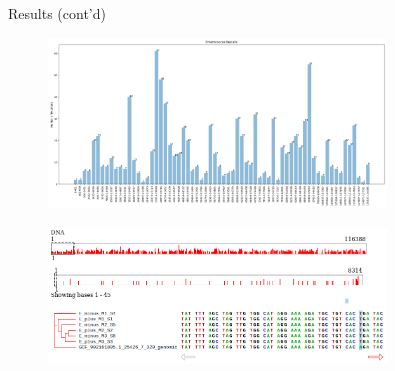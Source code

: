 \documentclass{beamer}
\begin{document}
\begin{frame}{Results (cont'd)}
	\begin{figure}[ht]
		\centering
		\includegraphics[width=0.8\textwidth,height=0.3\textheight]{img/Enterococcus-faecalis.png}
		\caption*{\label{fig:Enterococcus-hist}}
	\end{figure}
	\vspace{-1cm}
	\begin{figure}[ht]
		\centering
		\includegraphics[width=0.8\textwidth,height=0.4\textheight]{img/Enterococcus-faecalis-msa.png}
		\caption*{\label{fig:Enterococcus-msa}}
	\end{figure}

\end{frame}
\end{document}
